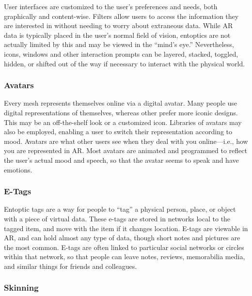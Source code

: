 User interfaces are customized to the user's preferences
and needs, both graphically and content-wise.
Filters allow users to access the information they 
are interested in without needing to worry about 
extraneous data. While AR data is typically placed 
in the user's normal field of vision, entoptics are not 
actually limited by this and may be viewed in the 
``mind's eye.'' Nevertheless, icons, windows and other 
interaction prompts can be layered, stacked, toggled, 
hidden, or shifted out of the way if necessary to interact
with the physical world.

\subsubsection{Avatars}

Every mesh represents themselves online via a digital
avatar. Many people use digital representations
of themselves, whereas other prefer more iconic 
designs. This may be an off-the-shelf look or a 
customized icon. Libraries of avatars may also be 
employed, enabling a user to switch their representation
according to mood. Avatars are what other
users see when they deal with you online—i.e., how 
you are represented in AR. Most avatars are animated
and programmed to reflect the user's actual
mood and speech, so that the avatar seems to speak 
and have emotions.

\subsubsection{E-Tags}

Entoptic tags are a way for people to ``tag'' a physical 
person, place, or object with a piece of virtual data. 
These e-tags are stored in networks local to the tagged 
item, and move with the item if it changes location. 
E-tags are viewable in AR, and can hold almost any 
type of data, though short notes and pictures are the 
most common. E-tags are often linked to particular 
social networks or circles within that network, so that 
people can leave notes, reviews, memorabilia media, 
and similar things for friends and colleagues.

\subsubsection{Skinning}

